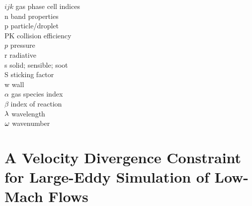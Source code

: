 \begin{tabbing}
$ijk$                     \> gas phase cell indices \\
n                         \> band properties \\
p                         \> particle/droplet \\
PK                        \> collision efficiency \\
$p$                       \> pressure \\
r                         \> radiative \\
s                         \> solid; sensible; soot\\
S                         \> sticking factor \\
w                         \> wall \\
$\alpha$                  \> gas species index \\
$\beta$                   \> index of reaction \\
$\lambda$                     \> wavelength \\
$\omega$                     \> wavenumber \\
\end{tabbing}





\chapter{A Velocity Divergence Constraint for Large-Eddy Simulation of Low-Mach Flows}
\label{app_divergence}


